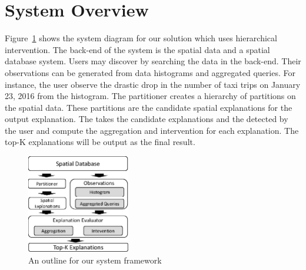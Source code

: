 \section{System Overview}

Figure~\ref{fig:framework} shows the system diagram for our solution which uses hierarchical intervention. 
The back-end of the system is the spatial data and a spatial database system. 
Users may discover {\fact} by searching the data in the back-end. Their observations can be generated from data histograms and aggregated queries. For instance, the user observe the drastic drop in the number of taxi trips on January 23, 2016 from the histogram. 
The partitioner creates a hierarchy of partitions on the spatial data. These partitions are the candidate spatial explanations for the output explanation. %
The {\evaluator} takes the candidate explanations and the {\fact} detected by the user and compute the aggregation and intervention for each explanation. 
The top-K explanations will be output as the final result.

\begin{figure}[t]
	\centering
		\includegraphics[width=0.4\textwidth]{images/architecture.eps}
		\caption{An outline for our system framework}
	\label{fig:framework}
\end{figure}

